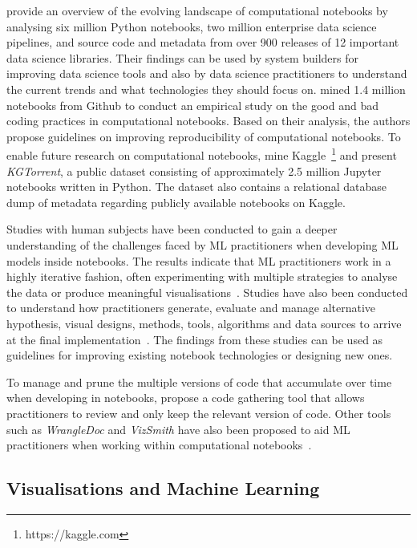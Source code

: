 \documentclass[acmsmall,screen,review,anonymous]{acmart}
\begin{document}
\citeauthor{psallidas2019data} provide an overview of the evolving landscape of computational notebooks by analysing six million Python notebooks, two million enterprise data science pipelines, and source code and metadata from over 900 releases of 12 important data science libraries. Their findings can be used by system builders for improving data science tools and also by data science practitioners to understand the current trends and what technologies they should focus on. \citeauthor{pimentel2019large} mined 1.4 million notebooks from Github to conduct an empirical study on the good and bad coding practices in computational notebooks. Based on their analysis, the authors propose guidelines on improving reproducibility of computational notebooks. To enable future research on computational notebooks, \citeauthor{quaranta2021kgtorrent} mine Kaggle~\footnote{https://kaggle.com} and present \textit{KGTorrent}, a public dataset consisting of approximately 2.5 million Jupyter notebooks written in Python. The dataset also contains a relational database dump of metadata regarding publicly available notebooks on Kaggle.

Studies with human subjects have been conducted to gain a deeper understanding of the challenges faced by ML practitioners when developing ML models inside notebooks. The results indicate that ML practitioners work in a highly iterative fashion, often experimenting with multiple strategies to analyse the data or produce meaningful visualisations~\cite{kandel2012enterprise, kery2018story, liu2019understanding, chattopadhyay2020wrong}. Studies have also been conducted to understand how practitioners generate, evaluate and manage alternative hypothesis, visual designs, methods, tools, algorithms and data sources to arrive at the final implementation~\cite{liu2019understanding,kandel2012enterprise}. The findings from these studies can be used as guidelines for improving existing notebook technologies or designing new ones.

To manage and prune the multiple versions of code that accumulate over time when developing in notebooks, \citeauthor{head2019managing} propose a code gathering tool that allows practitioners to review and only keep the relevant version of code. Other tools such as \textit{WrangleDoc} and \textit{VizSmith} have also been proposed to aid ML practitioners when working within computational notebooks~\cite{yang2021subtle, bavishi2021vizsmith}.

\subsection{Visualisations and Machine Learning}\label{sec:visualisations}
\end{document}
